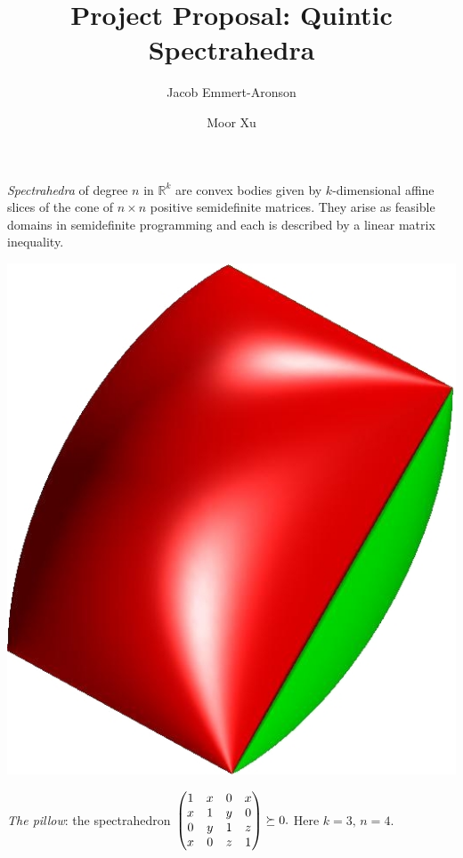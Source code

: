 \documentclass[12pt]{amsart}
\title{Project Proposal: Quintic Spectrahedra}
\author{Jacob Emmert-Aronson}
\author{Moor Xu}
\begin{document}
 
\maketitle

\emph{Spectrahedra} of degree $n$ in $\mathbb{R}^k$ are convex bodies
given by $k$-dimensional affine slices of the cone of $n \times n$
positive semidefinite matrices.  They arise as feasible domains in
semidefinite programming and each is described by a linear matrix
inequality.
\vspace\baselineskip

\begin{center}

\includegraphics[scale=.15]{pillow.jpg}
\vspace\baselineskip

{\small
\emph{The pillow}: the spectrahedron
$
\begin{pmatrix}
  1&x&0&x\\
  x&1&y&0\\
  0&y&1&z\\
  x&0&z&1
\end{pmatrix}
\succeq 0\text.$  Here $k=3,\, n=4$.}
\end{center}
\vspace\baselineskip
\end{document}
